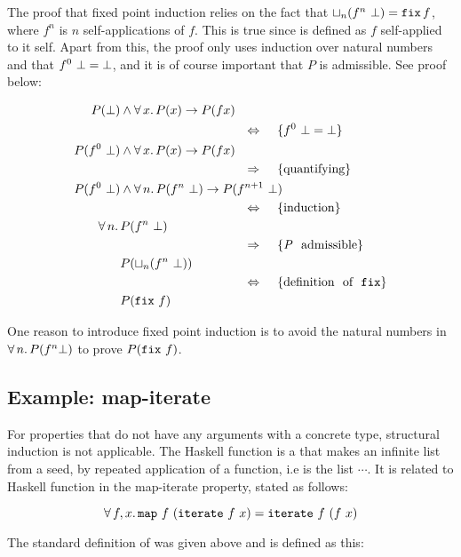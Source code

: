 The proof that fixed point induction relies on the fact that
$\lub{n}(f^n \w \bot) \eq \hs{fix} \, f$, where $f^n$ is $n$
self-applications of $f$. This is true since  is defined as
$f$ self-applied to it self. Apart from this, the proof only uses
induction over natural numbers and that $f^0 \,\, \bot = \bot$, and
it is of course important that $P$ is admissible. See proof below:

\begin{align*}
P(\bot) & \wedge \fa{x} P(x) \rightarrow P(f x) \\
\desclra{$f^0 \w \bot \eq \bot$} \\
P(f^0 \w \bot) & \wedge \fa{x} P(x) \rightarrow P(f x) \\
\descra{quantifying} \\
P(f^0 \w \bot) & \wedge \fa{n} P(f^n \w \bot) \rightarrow P(f^{n+1} \w \bot) \\
\desclra{induction} \\
\fa{n} & P(f^n \w \bot) \\
\descra{\textit{P} \w admissible} \\
& P(\lub{n}(f^n \w \bot)) \\
\desclra{definition \w of \w \hs{fix}} \\
& P(\hs{fix} \w f) \\
\end{align*}

One reason to introduce fixed point induction is to avoid the natural
numbers in $\forall \, n . \, P(f^n \bot)$  to prove $P(\hs{fix} \w f)$.

\subsection{Example: map-iterate}
\label{sec:mapiter}

For properties that do not have any arguments with a concrete type,
structural induction is not applicable. The Haskell function
 is a that makes an infinite list from a seed, by repeated
application of a function, i.e  is the list
 $\cdots$. It is related to Haskell function
  in the map-iterate property, stated as follows:

\begin{equation*}
\faa{f}{x} \hs{map} \w f \w (\hs{iterate} \w f \w x) \eq
           \hs{iterate} \w f \w (f \w x)
\end{equation*}

\noindent
The standard definition of  was given above and 
is defined as this:

